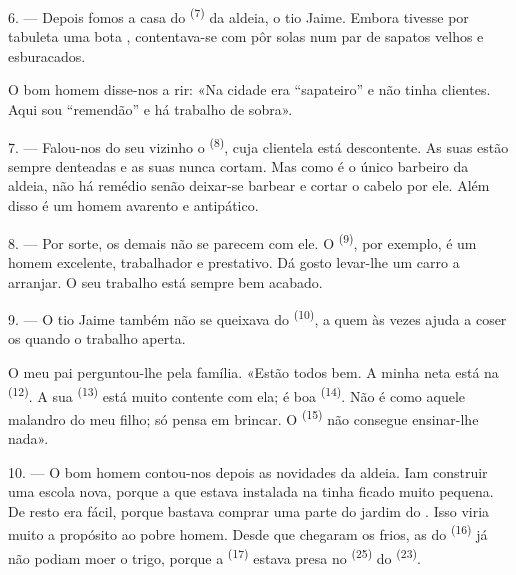 6. --- Depois fomos a casa do  \textsuperscript{(7)} da aldeia, o
tio Jaime. Embora tivesse por tabuleta uma bota ,
contentava-se com pôr solas num par de sapatos velhos e esburacados.

O bom homem disse-nos a rir: «Na cidade era “sapateiro” e não tinha
clientes. Aqui sou “remendão” e há trabalho de sobra».

7. --- Falou-nos do seu vizinho o  \textsuperscript{(8)}, cuja
clientela está descontente. As suas  estão sempre
denteadas e as suas  nunca cortam. Mas como é o único
barbeiro da aldeia, não há remédio senão deixar-se barbear e cortar o
cabelo por ele. Além disso é um homem avarento e antipático.

8. --- Por sorte, os demais  não se parecem com ele. O
 \textsuperscript{(9)}, por exemplo, é um homem excelente,
trabalhador e prestativo. Dá gosto levar-lhe um carro a arranjar. O seu
trabalho está sempre bem acabado.

9. --- O tio Jaime também não se queixava do 
\textsuperscript{(10)}, a quem às vezes ajuda a coser os  quando
o trabalho aperta.

O meu pai perguntou-lhe pela família. «Estão todos bem. A minha neta está
na  \textsuperscript{(12)}. A sua 
\textsuperscript{(13)} está muito contente com ela; é boa 
\textsuperscript{(14)}. Não é como aquele malandro do meu filho; só pensa em
brincar. O  \textsuperscript{(15)} não consegue ensinar-lhe
nada».

\VUsaut{3.0mm}
\VUsaut{3.0mm}

10. --- O bom homem contou-nos depois as novidades da aldeia. Iam
construir uma escola nova, porque a que estava instalada na  tinha ficado muito pequena. De resto era fácil, porque bastava
comprar uma parte do jardim do . Isso viria muito a
propósito ao pobre homem. Desde que chegaram os frios, as  do
 \textsuperscript{(16)} já não podiam moer o trigo, porque a
 \textsuperscript{(17)} estava presa no 
\textsuperscript{(25)} do  \textsuperscript{(23)}.

